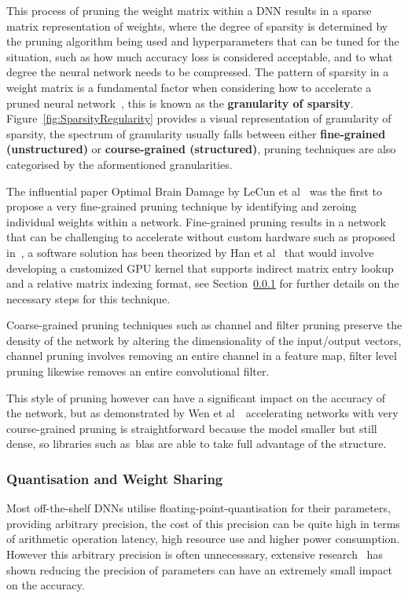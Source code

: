 \documentclass[../../D1.tex]{subfiles}
\begin{document}
This process of pruning the weight matrix within a DNN results in a sparse matrix representation of weights, where the degree of sparsity is determined by the pruning algorithm being used and hyperparameters that can be tuned for the situation, such as how much accuracy loss is considered acceptable, and to what degree the neural network needs to be compressed. 
The pattern of sparsity in a weight matrix is a fundamental factor when considering how to accelerate a pruned neural network~\autocite{maoExploringRegularitySparse2017}, this is known as the \textbf{granularity of sparsity}.
Figure~\ref{fig:SparsityRegularity} provides a visual representation of granularity of sparsity, the spectrum of granularity usually falls between either \textbf{fine-grained (unstructured)} or \textbf{course-grained (structured)}, pruning techniques are also categorised by the aformentioned granularities.


The influential paper Optimal Brain Damage by LeCun et al~\autocite{lecunOptimalBrainDamage} was the first to propose a very fine-grained pruning technique by identifying and zeroing individual weights within a network.
Fine-grained pruning results in a network that can be challenging to accelerate without custom hardware such as proposed in~\autocite{hanEIEEfficientInference2016,parasharSCNNAcceleratorCompressedsparse2017}, a software solution has been theorized by Han et al~\autocite{hanDeepCompressionCompressing2016} that would involve developing a customized GPU kernel that supports indirect matrix entry lookup and a relative matrix indexing format, see Section~\ref{sec:Quantisation} for further details on the necessary steps for this technique.


Coarse-grained pruning techniques such as channel and filter pruning preserve the density of the network by altering the dimensionality of the input/output vectors, channel pruning involves removing an entire channel in a feature map, filter level pruning likewise removes an entire convolutional filter. 

This style of pruning however can have a significant impact on the accuracy of the network, but as demonstrated by Wen et al~\autocite{wenLearningStructuredSparsity2016}~accelerating networks with very course-grained pruning is straightforward because the model smaller but still dense, so libraries such as~\acrshort{blas} are able to take full advantage of the structure. 




\subsubsection{Quantisation and Weight Sharing}\label{sec:Quantisation}
Most off-the-shelf DNNs utilise floating-point-quantisation for their parameters, providing arbitrary precision, the cost of this precision can be quite high in terms of arithmetic operation latency, high resource use and higher power consumption.
However this arbitrary precision is often unnecesssary, extensive research~\autocite{jacobQuantizationTrainingNeural2018,maOptimizingLoopOperation2017} has shown reducing the precision of parameters can have an extremely small impact on the accuracy.
\end{document}
